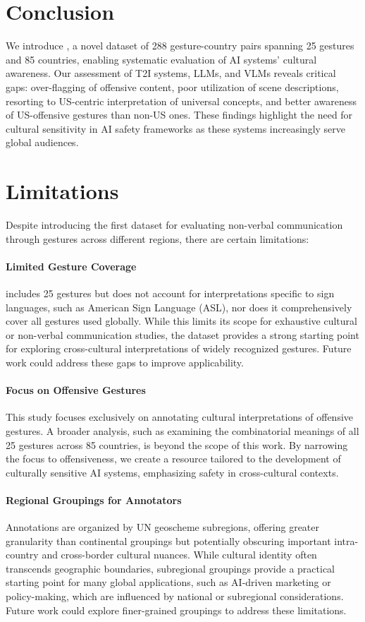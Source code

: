 \section{Conclusion}
We introduce \offHandsDataset, a novel dataset of 288 gesture-country pairs spanning 25 gestures and 85 countries, enabling systematic evaluation of AI systems' cultural awareness. Our assessment of T2I systems, LLMs, and VLMs reveals critical gaps: over-flagging of offensive content, poor utilization of scene descriptions, resorting to US-centric interpretation of universal concepts, and better awareness of US-offensive gestures than non-US ones. These findings highlight the need for cultural sensitivity in AI safety frameworks as these systems increasingly serve global audiences. 

\section{Limitations}
\label{sec:limitations}
Despite introducing the first dataset for evaluating non-verbal communication through gestures across different regions, there are certain limitations: 

\paragraph{Limited Gesture Coverage} 
\offHandsDataset includes 25 gestures but does not account for interpretations specific to sign languages, such as American Sign Language (ASL), nor does it comprehensively cover all gestures used globally. While this limits its scope for exhaustive cultural or non-verbal communication studies, the dataset provides a strong starting point for exploring cross-cultural interpretations of widely recognized gestures. Future work could address these gaps to improve applicability.

\paragraph{Focus on Offensive Gestures}
This study focuses exclusively on annotating cultural interpretations of offensive gestures. A broader analysis, such as examining the combinatorial meanings of all 25 gestures across 85 countries, is beyond the scope of this work.  By narrowing the focus to offensiveness, we create a resource tailored to the development of culturally sensitive AI systems, emphasizing safety in cross-cultural contexts.

\paragraph{Regional Groupings for Annotators}
Annotations are organized by UN geoscheme subregions, offering greater granularity than continental groupings but potentially obscuring important intra-country and cross-border cultural nuances. While cultural identity often transcends geographic boundaries, subregional groupings provide a practical starting point for many global applications, such as AI-driven marketing or policy-making, which are influenced by national or subregional considerations. Future work could explore finer-grained groupings to address these limitations.


